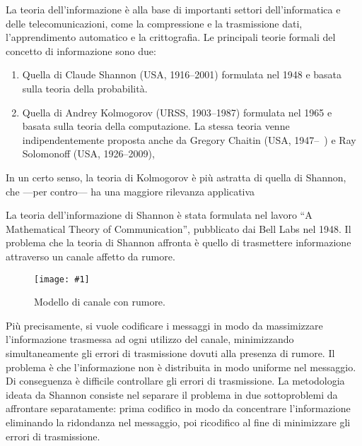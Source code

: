 \documentclass[11pt]{article}
\newcommand{\figscale}[2]{\texttt{[image: \#1]}}
\begin{document}
\begin{center}
\end{center}

\bigskip

La teoria dell'informazione è alla base di importanti settori dell'informatica e delle telecomunicazioni, come la compressione e la trasmissione dati, l'apprendimento automatico e la crittografia. Le principali teorie formali del concetto di informazione sono due:
\begin{enumerate}
\item Quella di Claude Shannon (USA, 1916--2001) formulata nel 1948 e basata sulla teoria della probabilità.
\item Quella di Andrey Kolmogorov (URSS, 1903--1987) formulata nel 1965 e basata sulla teoria della computazione. La stessa teoria venne indipendentemente proposta anche da Gregory Chaitin (USA, 1947--\ ) e Ray Solomonoff (USA, 1926--2009), 
\end{enumerate}
In un certo senso, la teoria di Kolmogorov è più astratta di quella di Shannon, che ---per contro--- ha una maggiore rilevanza applicativa

La teoria dell'informazione di Shannon è stata formulata nel lavoro ``A Mathematical Theory of Communication'', pubblicato dai Bell Labs nel 1948. Il problema che la teoria di Shannon affronta è quello di trasmettere informazione attraverso un canale affetto da rumore.

\begin{figure}[h]
\begin{center}
\figscale{Images/canale}{0.7}
\end{center}
\caption{
\label{fig:canale}
Modello di canale con rumore.
}
\end{figure}

Più precisamente, si vuole codificare i messaggi in modo da massimizzare l'informazione trasmessa ad ogni utilizzo del canale, minimizzando simultaneamente gli errori di trasmissione dovuti alla presenza di rumore. Il problema è che l'informazione non è distribuita in modo uniforme nel messaggio. Di conseguenza è difficile controllare gli errori di trasmissione. La metodologia ideata da Shannon consiste nel separare il problema in due sottoproblemi da affrontare separatamente: prima codifico in modo da concentrare l'informazione eliminando la ridondanza nel messaggio, poi ricodifico al fine di minimizzare gli errori di trasmissione.
\end{document}
